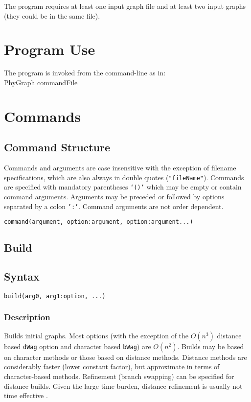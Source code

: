 \documentclass[11pt]{article}
\begin{document}
	

	
	The program requires at least one input graph file and at least two input graphs (they could be in the same file).

	
	\section{Program Use}
	The program is invoked from the command-line as in:\\
	PhyGraph commandFile\\
	
	\section{Commands}
		\subsection{Command Structure}
		Commands and arguments are case insensitive with the exception of filename specifications, which are also 
		always in double quotes (\texttt{"fileName"}).  Commands are specified with mandatory parentheses \texttt{`()'} which may be empty or
		contain command arguments. Arguments may be preceded or followed by options separated by a colon \texttt{':'}.  Command arguments are not 
		order dependent.
		
		\bigskip
		\texttt{command(argument, option:argument, option:argument...)}
	
	\subsection{Build}
		\subsection{Syntax}
		\texttt{build(arg0, arg1:option, ...)}
		\subsubsection{Description}
		Builds initial graphs.  Most options (with the exception of the $O(n^3)$ distance based \texttt{dWag} option and character based \texttt{bWag})
		are $O(n^2)$.  Builds may be based on character methods or those based on distance methods.  Distance methods are considerably faster 
		(lower constant factor), but approximate in terms of character-based methods.  Refinement (branch swapping) can be specified
		for distance builds.  Given the large time burden, distance refinement is usually not time effective \citep{Wheeler2021}.
\end{document}
